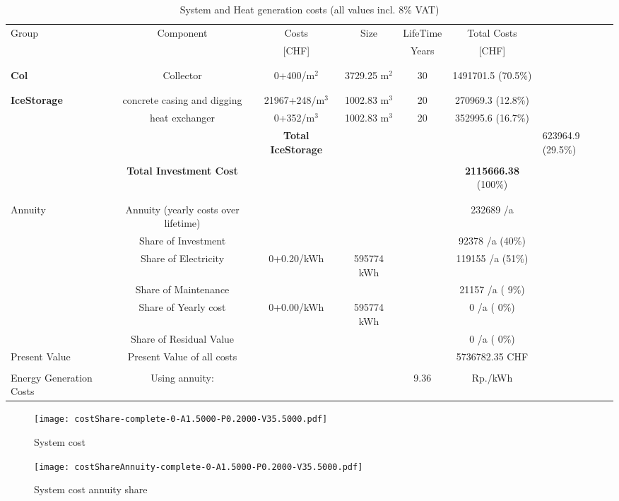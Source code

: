 \documentclass[english]{SPFShortReport}
\begin{document}
\begin{table}[!ht]
\centering
\caption{System and Heat generation costs (all values incl. 8$\%$ VAT) }
\begin{adjustbox}{max width =\textwidth}
\begin{tabular}{l | c c c c c } 
\hline
\hline
Group &Component &Costs &Size &LifeTime &Total Costs \\ 
 & &[CHF] & &Years &[CHF]\\ 
\hline
\\
\hline \\
\textbf{Col} & Collector & 0+400/m$^2$ & 3729.25 m$^2$ & 30 & 1491701.5 (70.5\%) \\
\hline \\
\hline \\
\textbf{IceStorage} & concrete casing and digging & 21967+248/m$^3$ & 1002.83 m$^3$ & 20 & 270969.3 (12.8\%) \\
 & heat exchanger & 0+352/m$^3$ & 1002.83 m$^3$ & 20 & 352995.6 (16.7\%) \\
&
 & \textbf{Total IceStorage} & & & & 623964.9 (29.5\%) \\
\hline \\
 & \textbf{Total Investment Cost} & & & & \textbf{2115666.38} (100\%) \\ 
\hline \\ 
\hline \\ 
Annuity & Annuity (yearly costs over lifetime)  &&& & 232689 /a  \\
 & Share of Investment & &&& 92378 /a (40\%) \\
 & Share of Electricity & 0+0.20/kWh & 595774 kWh &  & 119155 /a (51\%)\\
 & Share of Maintenance & &&& 21157 /a ( 9\%)\\ 
 & Share of Yearly cost & 0+0.00/kWh & 595774 kWh & &  0 /a ( 0\%)\\
 & Share of Residual Value &&& &  0 /a ( 0\%)\\
Present Value  & Present Value of all costs  & &&& 5736782.35 CHF \\
\hline \\ 
 Energy Generation Costs & Using annuity: &&& 9.36 & Rp./kWh \\
\hline
\hline
\end{tabular}
\end{adjustbox}
\label{CostsTable}
\end{table}
\begin{figure}[!htbp]
\begin{center}
\texttt{[image: costShare-complete-0-A1.5000-P0.2000-V35.5000.pdf]}
\caption{System cost}
\label{systemCost}
\end{center}
\end{figure}
\begin{figure}[!htbp]
\begin{center}
\texttt{[image: costShareAnnuity-complete-0-A1.5000-P0.2000-V35.5000.pdf]}
\caption{System cost annuity share}
\label{systemCostannuity}
\end{center}
\end{figure}
\end{document}

